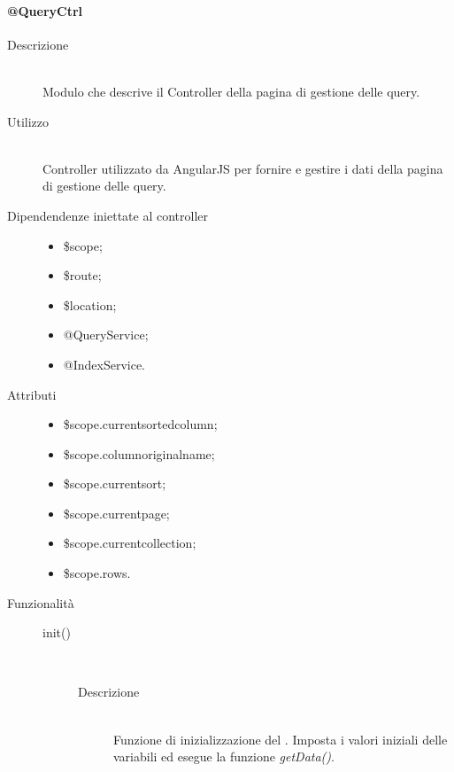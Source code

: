 \paragraph{@QueryCtrl}
\begin{description}
 \item[Descrizione] \hfill \\
 Modulo che descrive il Controller della pagina di gestione delle query.
 
 \item[Utilizzo] \hfill \\
 Controller utilizzato da AngularJS per fornire e gestire i dati della pagina di gestione delle query.
 
 
 \item[Dipendendenze iniettate al controller] \hfill
 \begin{itemize}
  \item \$scope;
  \item \$route;
  \item \$location;
  \item @QueryService;
  \item @IndexService.
 \end{itemize}
 
 \item[Attributi] \hfill
 \begin{itemize}
 \item \$scope.current\textunderscore sorted\textunderscore column;
 \item \$scope.column\textunderscore original\textunderscore name;
 \item \$scope.current\textunderscore sort;
 \item \$scope.current\textunderscore page;
 \item \$scope.current\textunderscore collection;
 \item \$scope.rows.
 \end{itemize}
 
 \item[Funzionalità] \hfill
 \begin{description}
  \item[init()] \hfill \\
  \begin{description}
  	\item[Descrizione] \hfill \\
  Funzione di inizializzazione del . Imposta i valori iniziali delle variabili ed esegue la funzione \textit{getData()}.
  \end{description}
  

\end{description}
\end{description}

